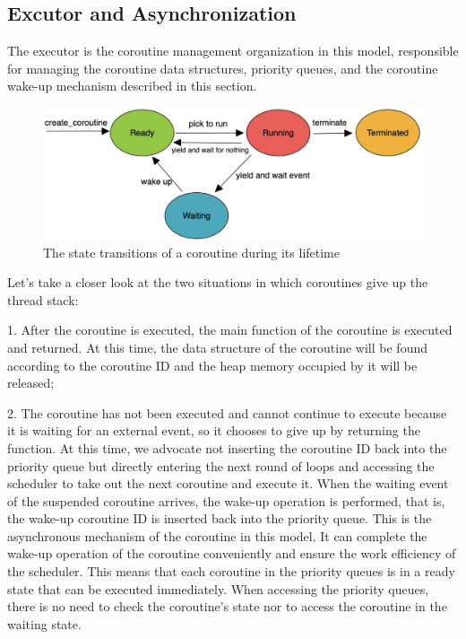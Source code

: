 \documentclass[10pt]{article}
\begin{document}
\subsection{Excutor and Asynchronization }

The executor is the coroutine management organization in this model, responsible for managing the coroutine data structures, priority queues, and the coroutine wake-up mechanism described in this section.

\begin{figure}[ht]
\begin{center}
\centerline{\includegraphics[width=\columnwidth]{states.png}}
\caption{The state transitions of a coroutine during its lifetime}
\label{states}
\end{center}
\end{figure}

Let's take a closer look at the two situations in which coroutines give up the thread stack:

1. After the coroutine is executed, the main function of the coroutine is executed and returned. At this time, the data structure of the coroutine will be found according to the coroutine ID and the heap memory occupied by it will be released;

2. The coroutine has not been executed and cannot continue to execute because it is waiting for an external event, so it chooses to give up by returning the function. At this time, we advocate not inserting the coroutine ID back into the priority queue but directly entering the next round of loops and accessing the scheduler to take out the next coroutine and execute it. When the waiting event of the suspended coroutine arrives, the wake-up operation is performed, that is, the wake-up coroutine ID is inserted back into the priority queue. This is the asynchronous mechanism of the coroutine in this model. It can complete the wake-up operation of the coroutine conveniently and ensure the work efficiency of the scheduler. This means that each coroutine in the priority queues is in a ready state that can be executed immediately. When accessing the priority queues, there is no need to check the coroutine's state nor to access the coroutine in the waiting state.
\end{document}
